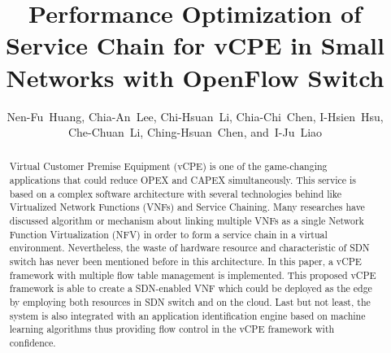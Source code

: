 \documentclass[10pt,journal]{IEEEtran}
\begin{document}
\title{Performance Optimization of Service Chain for vCPE in Small Networks with OpenFlow Switch}



\author{Nen-Fu~Huang, Chia-An~Lee, Chi-Hsuan~Li, Chia-Chi~Chen, I-Hsien~Hsu,\\
        Che-Chuan~Li, Ching-Hsuan~Chen, and~I-Ju~Liao
}

\maketitle


\begin{abstract}
Virtual Customer Premise Equipment (vCPE) is one of the game-changing applications that could reduce OPEX and CAPEX simultaneously. This service is based on a complex software architecture with several technologies behind like Virtualized Network Functions (VNFs) and Service Chaining. Many researches have discussed algorithm or mechanism about linking multiple VNFs as a single Network Function Virtualization (NFV) in order to form a service chain in a virtual environment. Nevertheless, the waste of hardware resource and characteristic of SDN switch has never been mentioned before in this architecture. In this paper, a vCPE framework with multiple flow table management is implemented. This proposed vCPE framework is able to create a SDN-enabled VNF which could be deployed as the edge by employing both resources in SDN switch and on the cloud. Last but not least, the system is also integrated with an application identification engine based on machine learning algorithms thus providing flow control in the vCPE framework with confidence.
\end{abstract}
\end{document}
